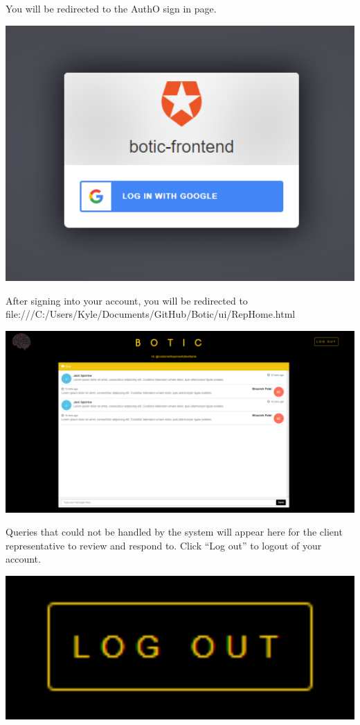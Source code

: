\documentclass[11pt]{article}
\begin{document}
\begin{flushleft}
	You will be redirected to the AuthO sign in page.
\end{flushleft}
\includegraphics[width=1.0\textwidth]{images/AuthO.png}

\begin{flushleft}
	After signing into your account, you will be redirected to file:///C:/Users/Kyle/Documents/GitHub/Botic/ui/RepHome.html
\end{flushleft}
\includegraphics[width=1.0\textwidth]{images/Rep.png}

\begin{flushleft}
	Queries that could not be handled by the system will appear here for the client representative to review and respond to.
	Click “Log out” to logout of your account.
\end{flushleft}
\includegraphics[width=1.0\textwidth]{images/LogOut.png}
\end{document}
